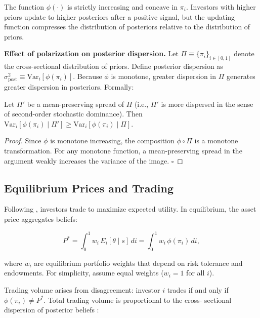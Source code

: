 The function $\phi(\cdot)$ is strictly increasing and concave in $\pi_i$.
Investors with higher priors update to higher posteriors after a positive
signal, but the updating function compresses the distribution of posteriors
relative to the distribution of priors.

\textbf{Effect of polarization on posterior dispersion.}
Let $\Pi \equiv \{\pi_i\}_{i \in [0,1]}$ denote the cross-sectional
distribution of priors. Define posterior dispersion as
$\sigma^2_{\text{post}} \equiv \text{Var}_i[\phi(\pi_i)]$.
Because $\phi$ is monotone, greater dispersion in $\Pi$ generates greater
dispersion in posteriors. Formally:

\begin{proposition}
    \label{prop:dispersion}
    Let $\Pi'$ be a mean-preserving spread of $\Pi$ (i.e., $\Pi'$ is more
    dispersed in the sense of second-order stochastic dominance).
    Then $\text{Var}_i[\phi(\pi_i) \mid \Pi'] \geq \text{Var}_i[\phi(\pi_i)
    \mid \Pi]$.
\end{proposition}

\begin{proof}
    Since $\phi$ is monotone increasing, the composition $\phi \circ \Pi$ is
    a monotone transformation. For any monotone function, a mean-preserving
    spread in the argument weakly increases the variance of the image.
    $\square$
\end{proof}

\subsection{Equilibrium Prices and Trading}

Following \citet{harris1993}, investors trade to maximize expected utility.
In equilibrium, the asset price aggregates beliefs:

\begin{equation}
    \label{eq:price}
    P^* = \int_0^1 w_i \, E_i[\theta \mid s] \, di
        = \int_0^1 w_i \, \phi(\pi_i) \, di,
\end{equation}

where $w_i$ are equilibrium portfolio weights that depend on risk tolerance
and endowments. For simplicity, assume equal weights ($w_i = 1$ for all $i$).

Trading volume arises from disagreement: investor $i$ trades if and only if
$\phi(\pi_i) \neq P^*$. Total trading volume is proportional to the cross-
sectional dispersion of posterior beliefs \citep{kandel1995}:

